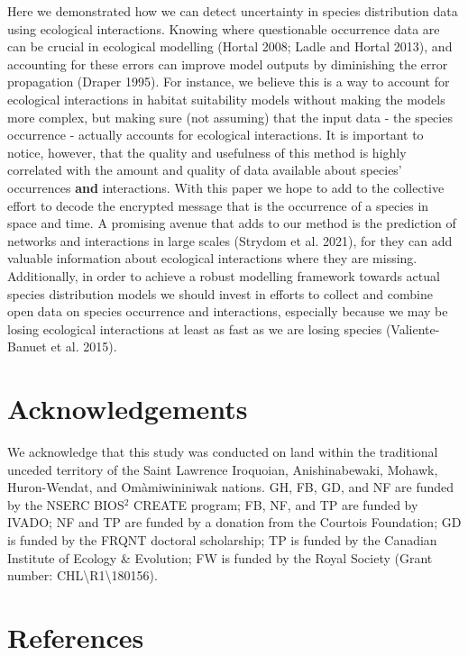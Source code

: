 \documentclass[10pt,oneside]{article}
\begin{document}
Here we demonstrated how we can detect uncertainty in species
distribution data using ecological interactions. Knowing where
questionable occurrence data are can be crucial in ecological modelling
(Hortal 2008; Ladle and Hortal 2013), and accounting for these errors
can improve model outputs by diminishing the error propagation (Draper
1995). For instance, we believe this is a way to account for ecological
interactions in habitat suitability models without making the models
more complex, but making sure (not assuming) that the input data - the
species occurrence - actually accounts for ecological interactions. It
is important to notice, however, that the quality and usefulness of this
method is highly correlated with the amount and quality of data
available about species' occurrences \textbf{and} interactions. With
this paper we hope to add to the collective effort to decode the
encrypted message that is the occurrence of a species in space and time.
A promising avenue that adds to our method is the prediction of networks
and interactions in large scales (Strydom et al. 2021), for they can add
valuable information about ecological interactions where they are
missing. Additionally, in order to achieve a robust modelling framework
towards actual species distribution models we should invest in efforts
to collect and combine open data on species occurrence and interactions,
especially because we may be losing ecological interactions at least as
fast as we are losing species (Valiente-Banuet et al. 2015).

\hypertarget{acknowledgements}{%
\section{Acknowledgements}\label{acknowledgements}}

We acknowledge that this study was conducted on land within the
traditional unceded territory of the Saint Lawrence Iroquoian,
Anishinabewaki, Mohawk, Huron-Wendat, and Omàmiwininiwak nations. GH,
FB, GD, and NF are funded by the NSERC BIOS\(^2\) CREATE program; FB,
NF, and TP are funded by IVADO; NF and TP are funded by a donation from
the Courtois Foundation; GD is funded by the FRQNT doctoral scholarship;
TP is funded by the Canadian Institute of Ecology \& Evolution; FW is
funded by the Royal Society (Grant number:
CHL\textbackslash R1\textbackslash180156).

\hypertarget{references}{%
\section*{References}\label{references}}
\end{document}
